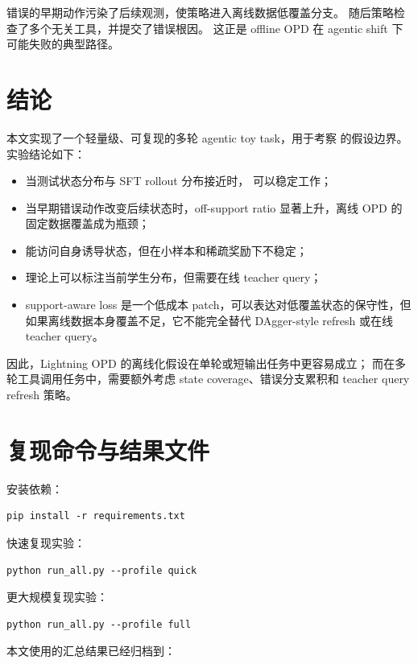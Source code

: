 \documentclass[11pt]{ctexart}
\begin{document}
错误的早期动作污染了后续观测，使策略进入离线数据低覆盖分支。
随后策略检查了多个无关工具，并提交了错误根因。
这正是 offline OPD 在 agentic shift 下可能失败的典型路径。

\section{结论}

本文实现了一个轻量级、可复现的多轮 agentic toy task，用于考察 \offlineopd{} 的假设边界。
实验结论如下：

\begin{itemize}
    \item 当测试状态分布与 SFT rollout 分布接近时，\offlineopd{} 可以稳定工作；
    \item 当早期错误动作改变后续状态时，off-support ratio 显著上升，离线 OPD 的固定数据覆盖成为瓶颈；
    \item \onlinerl{} 能访问自身诱导状态，但在小样本和稀疏奖励下不稳定；
    \item \onlineopd{} 理论上可以标注当前学生分布，但需要在线 teacher query；
    \item support-aware loss 是一个低成本 patch，可以表达对低覆盖状态的保守性，但如果离线数据本身覆盖不足，它不能完全替代 DAgger-style refresh 或在线 teacher query。
\end{itemize}

因此，Lightning OPD 的离线化假设在单轮或短输出任务中更容易成立；
而在多轮工具调用任务中，需要额外考虑 state coverage、错误分支累积和 teacher query refresh 策略。

\section{复现命令与结果文件}

安装依赖：

\begin{lstlisting}
pip install -r requirements.txt
\end{lstlisting}

快速复现实验：

\begin{lstlisting}
python run_all.py --profile quick
\end{lstlisting}

更大规模复现实验：

\begin{lstlisting}
python run_all.py --profile full
\end{lstlisting}

本文使用的汇总结果已经归档到：
\end{document}
